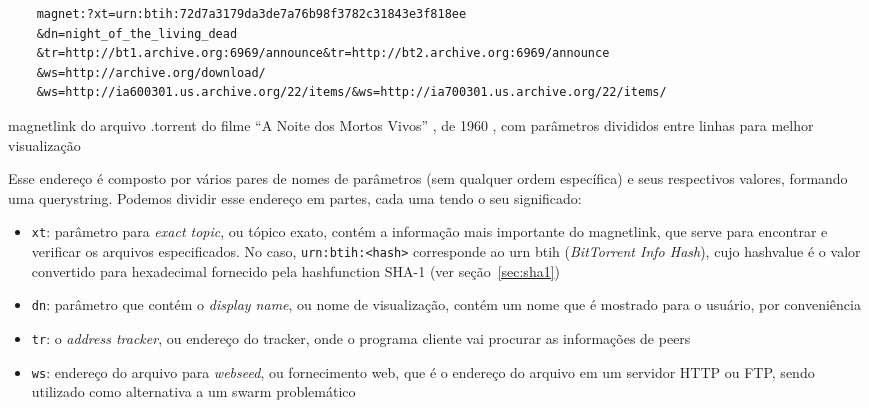 \begin{listing}[ht!]
    \begin{verbatim}
    magnet:?xt=urn:btih:72d7a3179da3de7a76b98f3782c31843e3f818ee
    &dn=night_of_the_living_dead
    &tr=http://bt1.archive.org:6969/announce&tr=http://bt2.archive.org:6969/announce
    &ws=http://archive.org/download/
    &ws=http://ia600301.us.archive.org/22/items/&ws=http://ia700301.us.archive.org/22/items/
    \end{verbatim}
    \caption{\gls*{magnetlink} do arquivo .torrent do filme ``A Noite dos Mortos Vivos''
    , de 1960 \cite{torrent-file}, com parâmetros divididos entre linhas para melhor
    visualização}
    \label{lst:torrent-file-magnet-link}
\end{listing}

Esse endereço é composto por vários pares de nomes de parâmetros (sem qualquer ordem
específica) e seus respectivos valores, formando uma \gls{querystring}. Podemos
dividir esse endereço em partes, cada uma tendo o seu significado:

\begin{itemize}
    \item \verb|xt|: parâmetro para \emph{exact topic}, ou tópico exato, contém a
        informação mais importante do \gls*{magnetlink}, que serve para encontrar e
        verificar os arquivos especificados. No caso, \verb|urn:btih:<hash>|
        corresponde ao \gls{urn} btih (\emph{BitTorrent Info Hash}), cujo
        \gls{hashvalue} é o valor convertido para hexadecimal fornecido pela
        \gls{hashfunction} SHA-1 (ver seção~\ref{sec:sha1})

    \item \verb|dn|: parâmetro que contém o \emph{display name}, ou nome de
        visualização, contém um nome que é mostrado para o usuário, por conveniência

    \item \verb|tr|: o \emph{address tracker}, ou endereço do \gls*{tracker}, onde o
        programa cliente vai procurar as informações de \glspl*{peer}

    \item \verb|ws|: endereço do arquivo para \emph{webseed}, ou fornecimento web,
        que é o endereço do arquivo em um servidor HTTP ou FTP, sendo utilizado como
        alternativa a um \gls*{swarm} problemático \cite{wiki:torrent}
\end{itemize}



